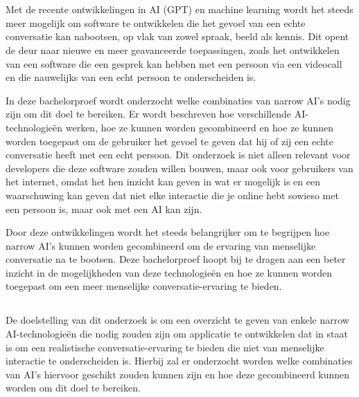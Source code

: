 
\chapter{}
\label{ch:inleiding}

Met de recente ontwikkelingen in AI (GPT) en machine learning wordt het steeds meer mogelijk om software te ontwikkelen die het gevoel van een echte conversatie kan nabootsen, op vlak van zowel spraak, beeld als kennis. Dit opent de deur naar nieuwe en meer geavanceerde toepassingen, zoals het ontwikkelen van een software die een gesprek kan hebben met een persoon via een videocall en die nauwelijks van een echt persoon te onderscheiden is.

In deze bachelorproef wordt onderzocht welke combinaties van narrow AI's nodig zijn om dit doel te bereiken. Er wordt beschreven hoe verschillende AI-technologieën werken, hoe ze kunnen worden gecombineerd en hoe ze kunnen worden toegepast om de gebruiker het gevoel te geven dat hij of zij een echte conversatie heeft met een echt persoon. Dit onderzoek is niet alleen relevant voor developers die deze software zouden willen bouwen, maar ook voor gebruikers van het internet, omdat het hen inzicht kan geven in wat er mogelijk is en een waarschuwing kan geven dat niet elke interactie die je online hebt sowieso met een persoon is, maar ook met een AI kan zijn.

Door deze ontwikkelingen wordt het steeds belangrijker om te begrijpen hoe narrow AI's kunnen worden gecombineerd om de ervaring van menselijke conversatie na te bootsen. Deze bachelorproef hoopt bij te dragen aan een beter inzicht in de mogelijkheden van deze technologieën en hoe ze kunnen worden toegepast om een meer menselijke conversatie-ervaring te bieden.

\section{}
\label{sec:onderzoeksdoelstelling}

De doelstelling van dit onderzoek is om een overzicht te geven van enkele narrow AI-technologieën die nodig zouden zijn om applicatie te ontwikkelen dat in staat is om een realistische conversatie-ervaring te bieden die niet van menselijke interactie te onderscheiden is. Hierbij zal er onderzocht worden welke combinaties van AI's hiervoor geschikt zouden kunnen zijn en hoe deze gecombineerd kunnen worden om dit doel te bereiken.

